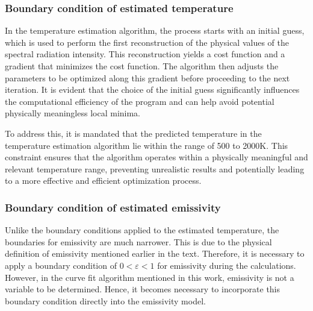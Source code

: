 \subsubsection{Boundary condition of estimated temperature}
In the temperature estimation algorithm, the process starts with an 
initial guess, which is used to perform the first reconstruction of 
the physical values of the spectral radiation intensity. This 
reconstruction yields a cost function and a gradient that 
minimizes the cost function. The algorithm then adjusts the parameters 
to be optimized along this gradient before proceeding to the next 
iteration. It is evident that the choice of the initial guess 
significantly influences the computational efficiency of the 
program and can help avoid potential physically meaningless 
local minima.

To address this, it is mandated that the predicted temperature in the 
temperature estimation algorithm lie within the range of 500 to 2000K. 
This constraint ensures that the algorithm operates within a 
physically meaningful and relevant temperature range, preventing 
unrealistic results and potentially leading to a more effective and 
efficient optimization process.

\subsubsection{Boundary condition of estimated emissivity}
Unlike the boundary conditions applied to the estimated temperature, 
the boundaries for emissivity are much narrower. This is due to the 
physical definition of emissivity mentioned earlier in the text. 
Therefore, it is necessary to apply a boundary condition 
of $0 < \varepsilon < 1$ for emissivity during the calculations. 
However, in the curve fit algorithm mentioned in this work, emissivity 
is not a variable to be determined. Hence, it becomes necessary to 
incorporate this boundary condition directly into the emissivity model.